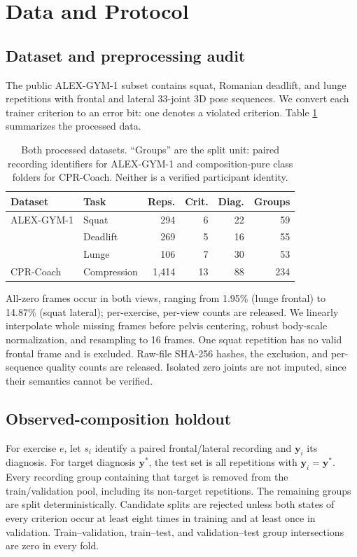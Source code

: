 \documentclass[conference,a4paper]{IEEEtran}
\begin{document}
\section{Data and Protocol}
\subsection{Dataset and preprocessing audit}
The public ALEX-GYM-1 subset contains squat, Romanian deadlift, and lunge
repetitions with frontal and lateral 33-joint 3D pose sequences. We convert each
trainer criterion to an error bit: one denotes a violated criterion. Table
\ref{tab:data} summarizes the processed data.

\begin{table}[t]
\centering
\caption{Both processed datasets. ``Groups'' are the split unit: paired
recording identifiers for ALEX-GYM-1 and composition-pure class folders for
CPR-Coach. Neither is a verified participant identity.}
\label{tab:data}
\small
\setlength{\tabcolsep}{3.5pt}
\begin{tabular}{llrrrr}
\toprule
Dataset & Task & Reps. & Crit. & Diag. & Groups\\
\midrule
ALEX-GYM-1 & Squat & 294 & 6 & 22 & 59\\
& Deadlift & 269 & 5 & 16 & 55\\
& Lunge & 106 & 7 & 30 & 53\\
\midrule
CPR-Coach & Compression & 1{,}414 & 13 & 88 & 234\\
\bottomrule
\end{tabular}
\end{table}

All-zero frames occur in both views, ranging from 1.95\% (lunge frontal) to
14.87\% (squat lateral); per-exercise, per-view counts are released. We linearly
interpolate whole missing frames before pelvis centering, robust body-scale
normalization, and resampling to 16 frames. One squat repetition has no valid
frontal frame and is excluded. Raw-file SHA-256 hashes, the exclusion, and
per-sequence quality counts are released. Isolated zero joints are not imputed,
since their semantics cannot be verified.

\subsection{Observed-composition holdout}
For exercise $e$, let $s_i$ identify a paired frontal/lateral recording and
$\mathbf y_i$ its diagnosis. For target diagnosis $\mathbf y^*$, the test set is
all repetitions with $\mathbf y_i=\mathbf y^*$. Every recording group containing
that target is removed from the train/validation pool, including its non-target
repetitions. The remaining groups are split deterministically. Candidate splits
are rejected unless both states of every criterion occur at least eight times in
training and at least once in validation. Train--validation, train--test, and
validation--test group intersections are zero in every fold.
\end{document}
